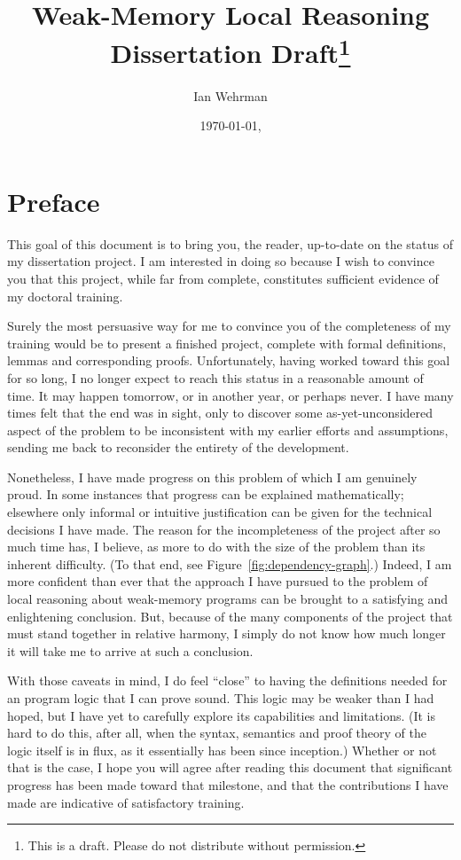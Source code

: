 \documentclass[11pt]{article}
\begin{document}
 

	\author{Ian Wehrman} 
	\title{Weak-Memory Local Reasoning\\Dissertation Draft\footnote{This is a draft. Please do not distribute without permission.}} 
	\date{\today, \currenttime}
	\maketitle

\section*{Preface}

This goal of this document is to bring you, the reader, up-to-date on the status of my dissertation project. I am interested in doing so because I wish to convince you that this project, while far from complete, constitutes sufficient evidence of my doctoral training. 

Surely the most persuasive way for me to convince you of the completeness of my training would be to present a finished project, complete with formal definitions, lemmas and corresponding proofs. Unfortunately, having worked toward this goal for so long, I no longer expect to reach this status in a reasonable amount of time. It may happen tomorrow, or in another year, or perhaps never. I have many times felt that the end was in sight, only to discover some as-yet-unconsidered aspect of the problem to be inconsistent with my earlier efforts and assumptions, sending me back to reconsider the entirety of the development. 

Nonetheless, I have made progress on this problem of which I am genuinely proud. In some instances that progress can be explained  mathematically; elsewhere only informal or intuitive justification can be given for the technical decisions I have made. The reason for the incompleteness of the project after so much time has, I believe, as more to do with the size of the problem than its inherent difficulty. (To that end, see Figure~\ref{fig:dependency-graph}.) Indeed, I am more confident than ever that the approach I have pursued to the problem of local reasoning about weak-memory programs can be brought to a satisfying and enlightening conclusion. But, because of the many components of the project that must stand together in relative harmony, I simply do not know how much longer it will take me to arrive at such a conclusion. 

With those caveats in mind, I do feel ``close'' to having the definitions needed for an program logic that I can prove sound. This logic may be weaker than I had hoped, but I have yet to carefully explore its capabilities and limitations. (It is hard to do this, after all, when the syntax, semantics and proof theory of the logic itself is in flux, as it essentially has been since inception.) Whether or not that is the case, I hope you will agree after reading this document that significant progress has been made toward that milestone, and that the contributions I have made are indicative of satisfactory training.
\end{document}
